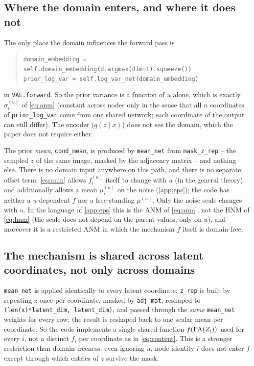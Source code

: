 \subsection{Where the domain enters, and where it does not}
\label{app:code:domain}
The only place the domain influences the forward pass is
\begin{quote}
\begin{flushleft}
\texttt{domain\_embedding = self.domain\_embedding(d.argmax(dim=1).squeeze())} \\
\texttt{prior\_log\_var = self.log\_var\_net(domain\_embedding)}
\end{flushleft}
\end{quote}
in \texttt{VAE.forward}. So the prior variance is a function of $u$ alone, which is exactly
$\sigma_i^{(u)}$ of \cref{eq:anm} (constant across nodes only in the sense that all $n$ coordinates of
\texttt{prior\_log\_var} come from one shared network; each coordinate of the output can still differ).
The encoder ($q(z\mid x)$) does not see the domain, which the paper does not require either.

The prior \emph{mean}, \texttt{cond\_mean}, is produced by \texttt{mean\_net} from
\texttt{mask\_z\_rep} -- the sampled $z$ of the same image, masked by the adjacency matrix -- and
nothing else. There is no domain input anywhere on this path, and there is no separate offset term:
\cref{eq:anm} allows $f_i^{(u)}$ itself to change with $u$ (in the general theory) and additionally allows a
mean $\mu_i^{(u)}$ on the noise (\cref{app:eps}); the code has neither a $u$-dependent $f$ nor a free-standing
$\mu^{(u)}$. Only the noise scale changes with $u$. In the language of \cref{app:eps} this is the ANM of
\cref{eq:anm}, not the HNM of \cref{eq:hnm} (the scale does not depend on the parent values, only on $u$),
and moreover it is a restricted ANM in which the mechanism $f$ itself is domain-free.

\subsection{The mechanism is shared across latent coordinates, not only across domains}
\texttt{mean\_net} is applied identically to every latent coordinate: \texttt{z\_rep} is built by
repeating $z$ once per coordinate, masked by \texttt{adj\_mat}, reshaped to
\texttt{(len(x)*latent\_dim, latent\_dim)}, and passed through the \emph{same} \texttt{mean\_net} weights
for every row; the result is reshaped back to one scalar mean per coordinate. So the code implements a
single shared function $f(\mathrm{PA}(Z_i))$ used for every $i$, not a distinct $f_i$ per coordinate as in
\cref{eq:content}. This is a stronger restriction than domain-freeness: even ignoring $u$, node identity
$i$ does not enter $f$ except through which entries of $z$ survive the mask.

